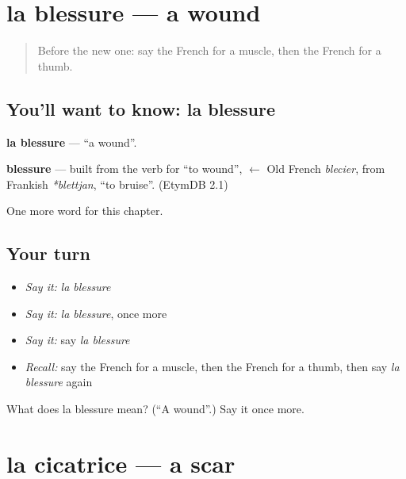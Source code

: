 \section[la blessure]{la blessure — a wound}

\label{lesson:FR-C185-blessure}



\begin{quote}
Before the new one: say the French for a muscle, then the French for a thumb.
\end{quote}

\subsection*{You'll want to know: la blessure}
\textbf{la blessure} — \textquotedblleft{}a wound\textquotedblright{}.

\begin{cousinweb}
\textbf{blessure} — built from the verb for \textquotedblleft{}to wound\textquotedblright{}, $\leftarrow$ Old French \emph{blecier}, from Frankish \emph{*blettjan}, \textquotedblleft{}to bruise\textquotedblright{}. (EtymDB 2.1)
\end{cousinweb}

\begin{grammarlens}[title={What you've built}]
One more word for this chapter.
\end{grammarlens}

\subsection*{Your turn}
\begin{itemize}
\raggedright
  \item \emph{Say it:} \emph{la blessure}
  \item \emph{Say it:} \emph{la blessure}, once more
  \item \emph{Say it:} say \emph{la blessure}
  \item \emph{Recall:} say the French for a muscle, then the French for a thumb, then say \emph{la blessure} again
\end{itemize}

\begin{tcolorbox}[breakable,colback=teal!4,colframe=teal!35!black,title={Before you move on}]
What does la blessure mean? (\textquotedblleft{}A wound\textquotedblright{}.) Say it once more.
\end{tcolorbox}
\section[la cicatrice]{la cicatrice — a scar}

